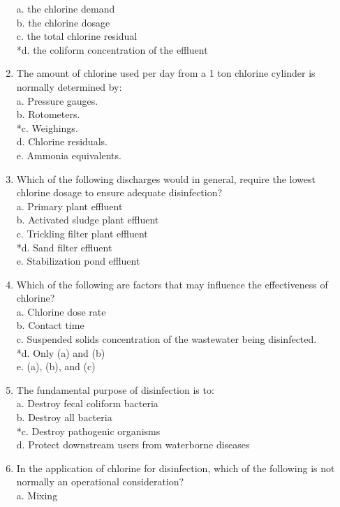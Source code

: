 \begin{enumerate}
a. the chlorine demand \\
b. the chlorine dosage \\
c. the total chlorine residual \\
*d. the coliform concentration of the effluent \\
\item The amount of chlorine used per day from a 1 ton chlorine cylinder is normally determined by: \\
a. Pressure gauges. \\
b. Rotometers. \\
*c. Weighings. \\
d. Chlorine residuals. \\
e. Ammonia equivalents. \\
\item Which of the following discharges would in general, require the lowest chlorine dosage to ensure adequate disinfection? \\
a. Primary plant effluent \\
b. Activated sludge plant effluent \\
c. Trickling filter plant effluent \\
*d. Sand filter effluent \\
e. Stabilization pond effluent \\
\item Which of the following are factors that may influence the effectiveness of chlorine? \\
a. Chlorine dose rate \\
b. Contact time \\
c. Suspended solids concentration of the wastewater being disinfected. \\
*d. Only (a) and (b) \\
e. (a), (b), and (c) \\
\item The fundamental purpose of disinfection is to: \\
a. Destroy fecal coliform bacteria \\
b. Destroy all bacteria \\
*c. Destroy pathogenic organisms \\
d. Protect downstream users from waterborne diseases \\
\item In the application of chlorine for disinfection, which of the following is not normally an operational consideration? \\
a. Mixing \\

\end{enumerate}
